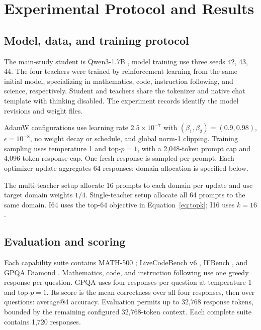 \section{Experimental Protocol and Results}
\label{app:setup}

\subsection{Model, data, and training protocol}

The main-study student is Qwen3-1.7B \citep{qwen2025qwen3}, model training use three seeds 42, 43, 44. The four teachers were trained by reinforcement learning from the same initial model, specializing in mathematics, code, instruction following, and science, respectively. Student and teachers share the tokenizer and native chat template with thinking disabled. The experiment records identify the model revisions and weight files.

AdamW configurations use learning rate $2.5\times10^{-7}$ with $(\beta_1,\beta_2)=(0.9,0.98)$, $\epsilon=10^{-8}$, no weight decay or schedule, and global norm-1 clipping. Training sampling uses temperature 1 and top-$p=1$, with a 2,048-token prompt cap and 4,096-token response cap. One fresh response is sampled per prompt. Each optimizer update aggregates 64 responses; domain allocation is specified below.

The multi-teacher setup allocate 16 prompts to each domain per update and use target domain weights $1/4$. Single-teacher setup allocate all 64 prompts to the same domain. I64 uses the top-$64$ objective in Equation~\ref{eq:topk}; I16 uses $k=16$.


\subsection{Evaluation and scoring}

Each capability suite contains MATH-500 \citep{hendrycks2021math}; LiveCodeBench v6 \citep{jain2024livecodebench}, IFBench \citep{pyatkin2025ifbench}, and GPQA Diamond \citep{rein2023gpqa}. Mathematics, code, and instruction following use one greedy response per question. GPQA uses four responses per question at temperature 1 and top-$p=1$. Its score is the mean correctness over all four responses, then over questions: average@4 accuracy. Evaluation permits up to 32,768 response tokens, bounded by the remaining configured 32,768-token context. Each complete suite contains 1,720 responses.

